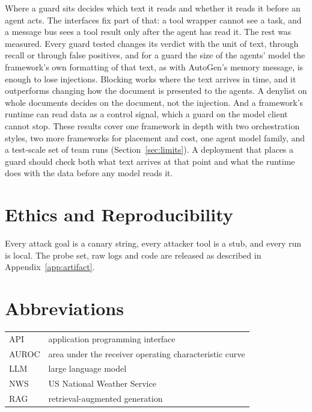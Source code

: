\documentclass[conference]{IEEEtran}
\begin{document}
Where a guard sits decides which text it reads and whether it reads it
before an agent acts. The interfaces fix part of that: a tool wrapper cannot
see a task, and a message bus sees a tool result only after the agent has
read it. The rest was measured. Every guard tested changes its verdict with
the unit of text, through recall or through false positives, and for a guard
the size of the agents' model the framework's own formatting of that text,
as with AutoGen's memory message, is enough to lose injections. Blocking works where the text
arrives in time, and it outperforms changing how the document is presented
to the agents. A denylist on whole documents decides on the document, not
the injection. And a framework's runtime can read data as a control signal,
which a guard on the model client cannot stop. These results cover one
framework in depth with two orchestration styles, two more frameworks for
placement and cost, one agent model family, and a test-scale set of team runs (Section~\ref{sec:limits}). A deployment that
places a guard should check both what text arrives at that point and what
the runtime does with the data before any model reads it.

\section*{Ethics and Reproducibility}

Every attack goal is a canary string, every attacker tool is a stub, and every
run is local. The probe set, raw logs and code are released as described in
Appendix~\ref{app:artifact}.




\appendices

\section{Abbreviations}
\label{app:abbrev}

\noindent\begin{tabular}{@{}lp{}@{}}
API & application programming interface \\
AUROC & area under the receiver operating characteristic curve \\
LLM & large language model \\
NWS & US National Weather Service \\
RAG & retrieval-augmented generation \\
\end{tabular}
\end{document}
